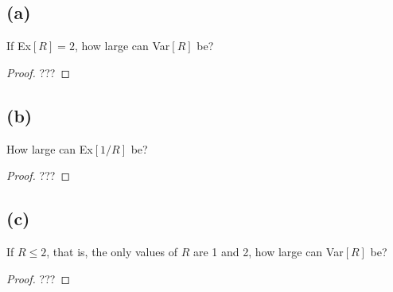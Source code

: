 \documentclass[14pt]{extarticle}
\begin{document}
\subsection{(a)}
If Ex$[R] = 2$, how large can Var$[R]$ be?

\begin{proof}
???
\end{proof}

\subsection{(b)}
How large can Ex$[1/R]$ be?

\begin{proof}
???
\end{proof}

\subsection{(c)}
If $R \leq 2$, that is, the only values of $R$ are 1 and 2, how large can Var$[R]$ be?

\begin{proof}
???
\end{proof}
\end{document}

